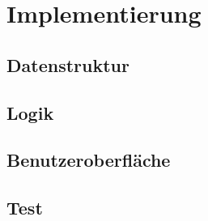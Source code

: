 \section{Implementierung}
\subsection{Datenstruktur}
\subsection{Logik}
\subsection{Benutzeroberfläche}
\subsection{Test}

